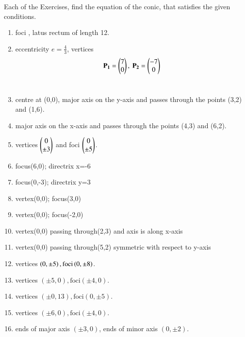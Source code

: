 Each of the Exercises, find the equation of the conic, that satisfies the given conditions.

\begin{enumerate}[label=\thesubsection.\arabic*,ref=\thesubsection.\theenumi,resume*]
\item  foci , latus rectum of length 12.
\\
\solution
    \item eccentricity $e = \frac{4}{3}$,
    vertices 
    \begin{align}
        \mathbf{P_1} = \begin{pmatrix}7\\0\end{pmatrix},\ \mathbf{P_2} = \begin{pmatrix}-7\\0\end{pmatrix}
        \label{eq:chapters/11/11/4/14/vert}
    \end{align}
\\
\solution
\item centre at (0,0), major axis on the y-axis and passes through the points (3,2) and (1,6).
\\
\solution
\item major axis on the x-axis and passes through the points (4,3) and (6,2).
\\
\solution
\item vertices $\begin{pmatrix}0\\\pm 3\end{pmatrix}$ and foci $\begin{pmatrix}0\\\pm5\end{pmatrix}$.
	\\
\solution
\item focus(6,0); directrix x=-6 
\item focus(0,-3); directrix y=3
\item vertex(0,0); focus(3,0)
\item vertex(0,0); focus(-2,0) 
\item vertex(0,0) passing through(2,3) and axis is along x-axis
\item vertex(0,0) passing through(5,2) symmetric with respect to y-axis
\item vertices $\left(0,\pm 5\right), \text{foci} \left(0,\pm 8\right)$.  
\item vertices $(\pm5,0),\text{foci} (\pm4,0)$.
\item vertices $(\pm0,13),\text{foci} (0,\pm5)$.
\item vertices $(\pm6,0),\text{foci} (\pm4,0)$.
\item ends of major axis $(\pm3,0)$, ends of minor axis $(0,\pm2)$.

\end{enumerate}
